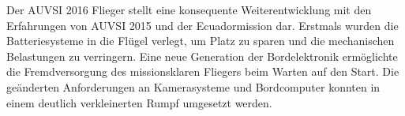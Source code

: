Der AUVSI 2016 Flieger stellt eine konsequente Weiterentwicklung mit den Erfahrungen von AUVSI 2015 und der Ecuadormission dar. Erstmals wurden die Batteriesysteme in die Flügel verlegt, um Platz zu sparen und die mechanischen Belastungen zu verringern. Eine neue Generation der Bordelektronik ermöglichte die Fremdversorgung des missionsklaren Fliegers beim Warten auf den Start. Die geänderten Anforderungen an Kamerasysteme und Bordcomputer konnten in einem deutlich verkleinerten Rumpf umgesetzt werden. 